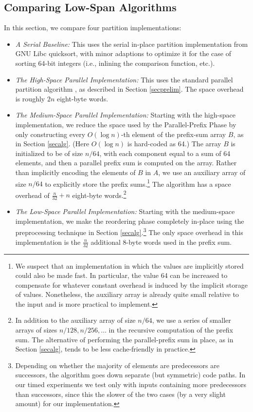 \documentclass[sigconf]{acmart}
\theoremstyle{remark}
\theoremstyle{remark}
\begin{document}
\subsection{Comparing Low-Span Algorithms}\label{subseclowspan}

In this section, we compare four partition implementations:
\begin{itemize}[leftmargin = .15in]
\item \emph{A Serial Baseline:} This uses the serial in-place
  partition implementation from GNU Libc quicksort, with minor
  adaptions to optimize it for the case of sorting 64-bit integers
  (i.e., inlining the comparison function, etc.).
\item \emph{The High-Space Parallel Implementation:} This uses the
  standard parallel partition algorithm \cite{Blelloch96,AcarBl16}, as
  described in Section \ref{secprelim}. The space overhead is roughly
  $2n$ eight-byte words.
\item \emph{The Medium-Space Parallel Implementation:} Starting with
  the high-space implementation, we reduce the space used by the
  Parallel-Prefix Phase by only constructing every $O(\log n)$-th
  element of the prefix-sum array $B$, as in Section
  \ref{secalg}. (Here $O(\log n)$ is hard-coded as 64.) The array $B$
  is initialized to be of size $n / 64$, with each component equal to
  a sum of 64 elements, and then a parallel prefix sum is computed on
  the array. Rather than implicitly encoding the elements of $B$ in
  $A$, we use an auxiliary array of size $n / 64$ to explicitly store
  the prefix sums.\footnote{We suspect that an implementation in which
    the values are implicitly stored could also be made fast. In
    particular, the value 64 can be increased to compensate for
    whatever constant overhead is induced by the implicit storage of
    values. Nonetheless, the auxiliary array is already quite small
    relative to the input and is more practical to implement.} The algorithm
  has a space overhead of $\frac{n}{32} + n$ eight-byte
  words.\footnote{In addition to the auxiliary array of size $n / 64$,
    we use a series of smaller arrays of sizes $n / 128, n / 256,
    \ldots$ in the recursive computation of the prefix sum. The
    alternative of performing the parallel-prefix sum in place, as in
    Section \ref{secalg}, tends to be less cache-friendly in
    practice.}
\item \emph{The Low-Space Parallel Implementation:}
Starting with the medium-space implementation, we make the reordering
phase completely in-place using the preprocessing technique in Section
\ref{secalg}.\footnote{Depending on whether the majority of elements
  are predecessors are successors, the algorithm goes down separate
  (but symmetric) code paths. In our timed experiments we test only
  with inputs containing more predecessors than successors, since this
  the slower of the two cases (by a very slight amount) for our
  implementation.} The only space overhead in this implementation is
the $\frac{n}{32}$ additional 8-byte words used in the prefix sum.
\end{itemize}
\end{document}
